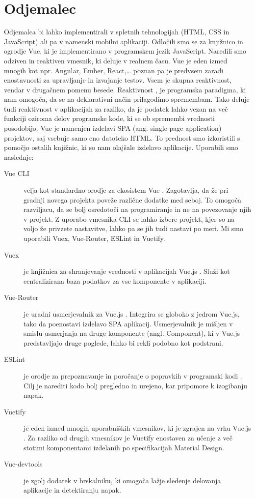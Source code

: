\documentclass[a4paper, 12pt]{book}
\begin{document}
\section{Odjemalec}

Odjemalca bi lahko implementirali v spletnih tehnologijah (HTML, CSS in JavaScript) ali pa v namenski mobilni aplikaciji. Odločili smo se za knjižnico in ogrodje Vue, ki je implementirano v programskem jezik JavaScript.  Naredili smo odziven in reaktiven vmesnik, ki deluje v realnem času. Vue je eden izmed mnogih kot npr. Angular, Ember, React,… poznan pa je predvsem zaradi enostavnosti za upravljanje in izvajanje testov. Vsem je skupna reaktivnost, vendar v drugačnem pomenu besede. Reaktivnost \cite{reaktivnost}, je programska paradigma, ki nam omogoča, da se na deklarativni način prilagodimo spremembam. Tako deluje tudi reaktivnost v aplikacijah za razliko, da je podatek lahko vezan na več funkciji oziroma delov programske kode, ki se ob spremembi vrednosti posodobijo. Vue je namenjen izdelavi SPA (ang. single-page application) projektov, saj vsebuje samo eno datoteko HTML. To prednost smo izkoristili s pomočjo ostalih knjižnic, ki so nam olajšale izdelavo aplikacije. Uporabili smo naslednje:
\begin{description}
\item[Vue CLI] velja kot standardno orodje za ekosistem Vue \cite{VueCLI}. Zagotavlja, da že pri gradnji novega projekta poveže različne dodatke med seboj. To omogoča razviljacu, da se bolj osredotoči na programiranje in ne na povezovanje njih v projekt. Z uporabo vmesnika CLI se lahko izbere projekt, kjer so na voljo že privzete nastavitve, lahko pa se jih tudi nastavi po meri. Mi smo uporabili Vuex, Vue-Router, ESLint in Vuetify.
\item[Vuex] je knjižnica za shranjevanje vrednosti v aplikacijah Vue.js \cite{Vuex}. Služi kot centralizirana baza podatkov za vse komponente v aplikaciji. 
\item[Vue-Router] je uradni usmerjevalnik za Vue.js \cite{VueRouter}. Integrira se globoko z jedrom Vue.js, tako da poenostavi izdelavo SPA aplikacij. Usmerjevalnik je mišljen v smislu usmerjanja na druge komponente (angl. Component), ki v Vue.js predstavljajo druge poglede, lahko bi rekli podobno kot podstrani.
\item[ESLint] je orodje za prepoznavanje in poročanje o popravkih v programski kodi \cite{ESLint}. Cilj je narediti kodo bolj pregledno in urejeno, kar pripomore k izogibanju napak.
\item[Vuetify] je eden izmed mnogih uporabniških vmesnikov, ki je zgrajen na vrhu Vue.js \cite{Vuetify}. Za razliko od drugih vmesnikov je Vuetify enostaven za učenje z več stotimi komponentami izdelanih po specifikacijah Material Design.
\item[Vue-devtools] je zgolj dodatek v brskalniku, ki omogoča lažje sledenje delovanja aplikacije in detektiranju napak. 

\end{description}
\end{document}

